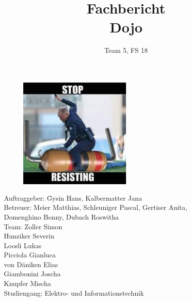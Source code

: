 \documentclass{fhnwreport}
\title{%
  Fachbericht\\[2ex]
  Dojo}
\author{%
  Team 5, FS 18}
\begin{document}
\maketitle

\vfill

\begin{figure}[H]
	\centering
	\includegraphics[width = 0.5\textwidth]{Data/Titelbild}
	\label{fig:Titelbild}
\end{figure}

\vfill

\begin{tabbing}
Auftraggeber: \hspace{2em} \=  Gysin Hans, Kalbermatter Jana \\[2ex]
Betreuer:  \>  Meier Matthias, Schleuniger Pascal, Gertiser Anita, \\ \> Domenghino Bonny, Dubach Roswitha \\[2ex]
Team:  \> Zoller Simon \\ 
\> Hunziker Severin \\
\> Loosli Lukas \\
\> Picciola Gianluca \\
\> von Däniken Elias \\
\> Giambonini Joscha \\
\> Knupfer Mischa \\[2ex]
Studiengang: \> Elektro- und Informationstechnik
\end{tabbing}

\hbox{}
\clearpage




\newpage


\tableofcontents
\newpage

\end{document}
